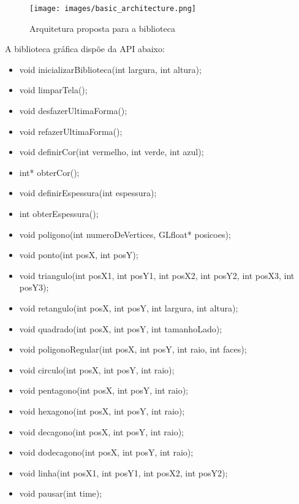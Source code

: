 \documentclass[12pt, %
openright,
oneside, %
a4paper,    %
brazil]{facom-ufu-abntex2}
\begin{document}
\begin{figure}[htbp]
  \centering
  \texttt{[image: images/basic\_architecture.png]}
  \caption{Arquitetura proposta para a biblioteca}
  \label{fig:arquitetura_proposta}
\end{figure}

A biblioteca gráfica dispõe da API abaixo:

\begin{itemize}
    \item void inicializarBiblioteca(int largura, int altura);
    \item void limparTela();
    
    \item void desfazerUltimaForma();
    \item void refazerUltimaForma();
    
    \item void definirCor(int vermelho, int verde, int azul);
    \item int* obterCor();
    
    \item void definirEspessura(int espessura);
    \item int obterEspessura();

    \item void poligono(int numeroDeVertices, GLfloat* posicoes);
    \item void ponto(int posX, int posY);
    \item void triangulo(int posX1, int posY1, int posX2, int posY2, int posX3, int posY3);
    \item void retangulo(int posX, int posY, int largura, int altura);
    \item void quadrado(int posX, int posY, int tamanhoLado);
    \item void poligonoRegular(int posX, int posY, int raio, int faces);
    \item void circulo(int posX, int posY, int raio);
    \item void pentagono(int posX, int posY, int raio);
    \item void hexagono(int posX, int posY, int raio);
    \item void decagono(int posX, int posY, int raio);
    \item void dodecagono(int posX, int posY, int raio);
    \item void linha(int posX1, int posY1, int posX2, int posY2);
    
    \item void pausar(int time);
\end{itemize}
\end{document}
